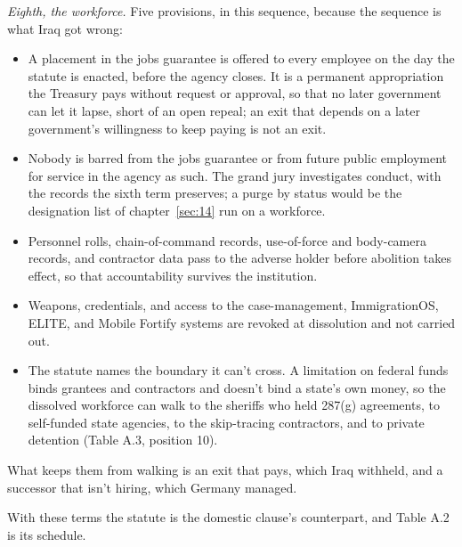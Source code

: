 \emph{Eighth, the workforce.} Five provisions, in this sequence, because the sequence is what Iraq got wrong:

\begin{itemize}
\item A placement in the jobs guarantee is offered to every employee on the day the statute is enacted, before the agency closes. It is a permanent appropriation the Treasury pays without request or approval, so that no later government can let it lapse, short of an open repeal; an exit that depends on a later government's willingness to keep paying is not an exit.
\item Nobody is barred from the jobs guarantee or from future public employment for service in the agency as such. The grand jury investigates conduct, with the records the sixth term preserves; a purge by status would be the designation list of chapter~\ref{sec:14} run on a workforce.
\item Personnel rolls, chain-of-command records, use-of-force and body-camera records, and contractor data pass to the adverse holder before abolition takes effect, so that accountability survives the institution.
\item Weapons, credentials, and access to the case-management, ImmigrationOS, ELITE, and Mobile Fortify systems are revoked at dissolution and not carried out.
\item The statute names the boundary it can't cross. A limitation on federal funds binds grantees and contractors and doesn't bind a state's own money, so the dissolved workforce can walk to the sheriffs who held 287(g) agreements, to self-funded state agencies, to the skip-tracing contractors, and to private detention (Table A.3, position 10).
\end{itemize}

What keeps them from walking is an exit that pays, which Iraq withheld, and a successor that isn't hiring, which Germany managed.

With these terms the statute is the domestic clause's counterpart, and Table A.2 is its schedule.
